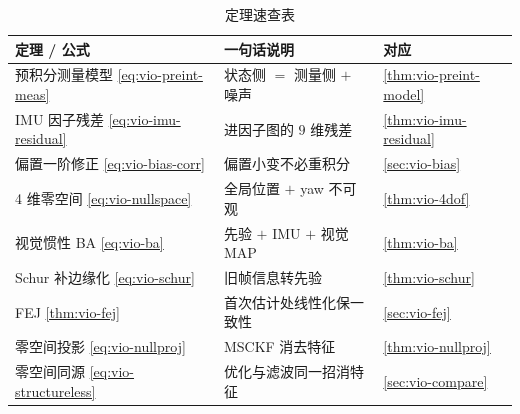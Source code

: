 \begin{table}[H]\centering\small
\caption{定理速查表}
\label{tab:vio-theorems}
\begin{tabular}{lll}
\toprule
定理 / 公式 & 一句话说明 & 对应 \\
\midrule
预积分测量模型 \cref{eq:vio-preint-meas} & 状态侧 $=$ 测量侧 $+$ 噪声 & \cref{thm:vio-preint-model} \\
IMU 因子残差 \cref{eq:vio-imu-residual} & 进因子图的 $9$ 维残差 & \cref{thm:vio-imu-residual} \\
偏置一阶修正 \cref{eq:vio-bias-corr} & 偏置小变不必重积分 & \cref{sec:vio-bias} \\
4 维零空间 \cref{eq:vio-nullspace} & 全局位置 $+$ yaw 不可观 & \cref{thm:vio-4dof} \\
视觉惯性 BA \cref{eq:vio-ba} & 先验 $+$ IMU $+$ 视觉 MAP & \cref{thm:vio-ba} \\
Schur 补边缘化 \cref{eq:vio-schur} & 旧帧信息转先验 & \cref{thm:vio-schur} \\
FEJ \cref{thm:vio-fej} & 首次估计处线性化保一致性 & \cref{sec:vio-fej} \\
零空间投影 \cref{eq:vio-nullproj} & MSCKF 消去特征 & \cref{thm:vio-nullproj} \\
零空间同源 \cref{eq:vio-structureless} & 优化与滤波同一招消特征 & \cref{sec:vio-compare} \\
\bottomrule
\end{tabular}
\end{table}

